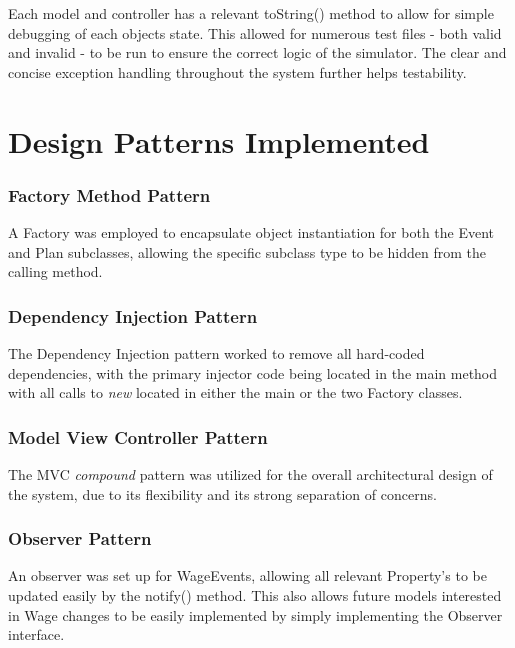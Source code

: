 \documentclass[]{article}
\begin{document}
Each model and controller has a relevant toString() method to allow for simple debugging of each objects state. This allowed for numerous test files - both valid and invalid - to be run to ensure the correct logic of the simulator. The clear and concise exception handling throughout the system further helps testability.


\break
\section*{Design Patterns Implemented}

\subsubsection*{Factory Method Pattern}

A Factory was employed to encapsulate object instantiation for both the Event and Plan subclasses, allowing the specific subclass type to be hidden from the calling method.

\subsubsection*{Dependency Injection Pattern}

The Dependency Injection pattern worked to remove all hard-coded dependencies, with the primary injector code being located in the main method with all calls to \textit{new} located in either the main or the two Factory classes.

\subsubsection*{Model View Controller Pattern}

The MVC \textit{compound} pattern was utilized for the overall architectural design of the system, due to its flexibility and its strong separation of concerns.

\subsubsection*{Observer Pattern}

An observer was set up for WageEvents, allowing all relevant Property's to be updated easily by the notify() method. This also allows future models interested in Wage changes to be easily implemented by simply implementing the Observer interface.
\end{document}

